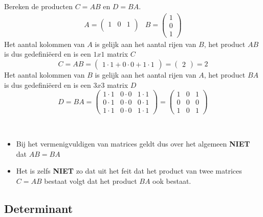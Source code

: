 \begin{voorbeeld}
		Bereken de producten $C=AB$ en $D=BA$.
	\[
	\begin{array}{ll}
	A=\left( \begin{matrix}
	1 & 0 & 1 \\
	\end{matrix} \right) &
	B=\left( \begin{matrix}
	1 \\ 0 \\ 1
	\end{matrix} \right)
	\end{array}	
	\]
	Het aantal kolommen van $A$ is gelijk aan het aantal rijen van $B$, het product $AB$ is dus gedefini\"{e}erd en is een $1x1$ matrix $C$
	\[ C=AB=\left( \begin{matrix} 1\cdot 1+0\cdot 0+1\cdot 1 \end{matrix} \right)=\left( \begin{matrix} 2 \end{matrix} \right)=2 \]
	Het aantal kolommen van $B$ is gelijk aan het aantal rijen van $A$, het product $BA$ is dus gedefini\"{e}erd en is een $3x3$ matrix $D$
	\[
	D=BA=\left( \begin{matrix} 1\cdot 1 & 0\cdot 0 & 1\cdot 1 \\ 0\cdot 1 & 0\cdot 0 & 0\cdot 1 \\  1\cdot 1 & 0\cdot 0 & 1\cdot 1 \end{matrix} \right)=\left( \begin{matrix} 1 & 0 & 1 \\ 0 & 0 & 0 \\  1 & 0 & 1 \end{matrix} \right)
	\]
\end{voorbeeld}


\begin{opmerking}
	\ \\
	\begin{itemize}
\item Bij het vermenigvuldigen van matrices geldt dus over het algemeen {\bf NIET} dat $AB=BA$
\item Het is zelfs {\bf NIET} zo dat uit het feit dat het product van twee matrices $C=AB$ bestaat volgt dat het product $BA$ ook bestaat.
\end{itemize}
\end{opmerking}
\subsection{Determinant}

